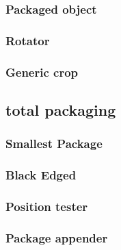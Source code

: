 \documentclass[10pt]{article}
\begin{document}
\subsubsection{Packaged object}

\subsubsection{Rotator}

\subsubsection{Generic crop}


\subsection{total packaging}
\subsubsection{Smallest Package}

\subsubsection{Black Edged}

\subsubsection{Position tester}

\subsubsection{Package appender}

\end{document}
